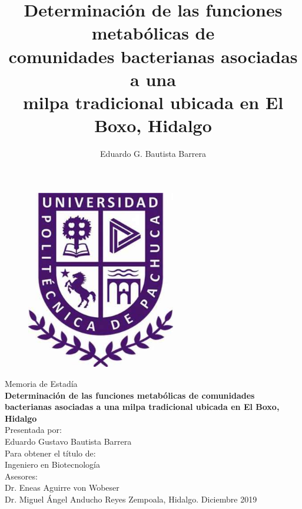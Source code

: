 \documentclass[12pt,letterpaper,oneside]{report}
\begin{document}
\begin{titlepage}
\begin{center}
\vspace*{-2.5cm}
\begin{figure}[htb]
\begin{center}
\includegraphics[width=6.5cm]{figuras/UPP}
\end{center}
\end{figure}
\begin{Large}
Memoria de Estadía\\
\vspace*{0.25cm}
\textbf{Determinación de las funciones metabólicas de comunidades bacterianas asociadas a una milpa tradicional ubicada en El Boxo, Hidalgo} \\
\vspace*{0.25cm}
Presentada por:\\
\vspace*{0.25cm}
Eduardo Gustavo Bautista Barrera\\
\vspace*{0.25cm}
Para obtener el título de:\\
\vspace*{0.25cm}
Ingeniero en Biotecnología\\
\vspace*{0.25cm}
Asesores:\\
\vspace*{0.5cm}
Dr. Eneas Aguirre von Wobeser\\
Dr. Miguel Ángel Anducho Reyes
\vfill
\footnotesize{Zempoala, Hidalgo. \hfill Diciembre 2019}
\end{Large}
\end{center}
\end{titlepage}
\thispagestyle{empty} %
\title{Determinación de las funciones metabólicas de \\ comunidades bacterianas asociadas a una \\ milpa tradicional ubicada en El Boxo, Hidalgo}
\author{Eduardo G. Bautista Barrera}
\date{}
\maketitle
\thispagestyle{empty}
\end{document}
